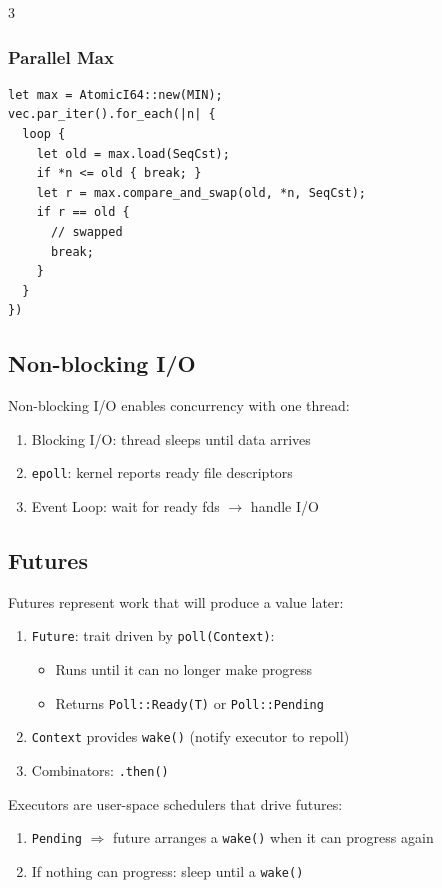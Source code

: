 \documentclass[12pt, a4paper]{article}
\begin{document}
\begin{multicols*}{3}
\subsubsection{Parallel Max}
\begin{lstlisting}[basicstyle=\ttfamily\scriptsize]
let max = AtomicI64::new(MIN);
vec.par_iter().for_each(|n| {
  loop {
    let old = max.load(SeqCst);
    if *n <= old { break; }
    let r = max.compare_and_swap(old, *n, SeqCst);
    if r == old {
      // swapped 
      break;
    }
  }
})
\end{lstlisting}

\colbreak
\subsection{Non-blocking I/O}
Non-blocking I/O enables concurrency with one thread:
\begin{enumerate}[\roman*.]
  \item Blocking I/O: thread sleeps until data arrives
  \item \lstinline|epoll|: kernel reports ready file descriptors
  \item Event Loop: wait for ready fds $\rightarrow$ handle I/O
\end{enumerate}

\subsection{Futures}
Futures represent work that will produce a value later: 
\begin{enumerate}[\roman*.]
  \item \lstinline|Future|: trait driven by \lstinline|poll(Context)|:
  \begin{itemize}[leftmargin=*]\vspace{3pt}
    \item Runs until it can no longer make progress
    \item Returns \lstinline|Poll::Ready(T)| or \lstinline|Poll::Pending|
  \end{itemize}
  \item \lstinline|Context| provides \lstinline|wake()| (notify executor to repoll)
  \item Combinators: \lstinline|.then()|
\end{enumerate}

Executors are user-space schedulers that drive futures:
\begin{enumerate}[\roman*.]
  \item \lstinline|Pending| $\Rightarrow$ future arranges a \lstinline|wake()| when it can progress again
  \item If nothing can progress: sleep until a \lstinline|wake()|
\end{enumerate}


\end{multicols*}
\end{document}
